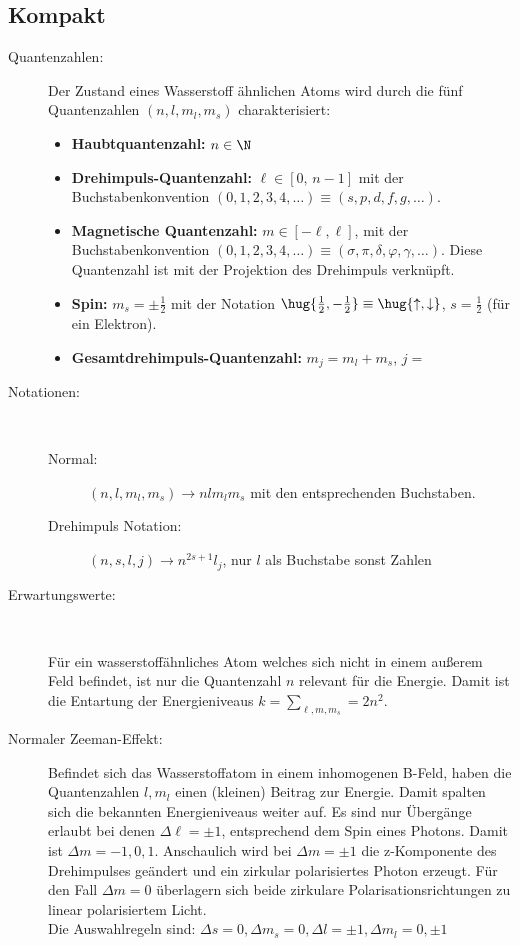 \documentclass[twocolumn]{summery_4.1}
\begin{document}
\subsection{Kompakt} 
\begin{description}
    \item[Quantenzahlen:]
    Der Zustand eines Wasserstoff ähnlichen Atoms wird durch die fünf Quantenzahlen $(n,l,m_l,m_s)$ charakterisiert:
    \begin{itemize}
        \item {\bf Haubtquantenzahl:} \(
            n\in\N\)
        \item {\bf Drehimpuls-Quantenzahl:} \(\ell\in[0,\,n-1]\)
        mit der Buchstabenkonvention \((0,1,2,3,4,\dots)\equiv (s,p,d,f,g,\dots)\). 
        \item {\bf Magnetische Quantenzahl:} \(m\in[-\ell,\ell]\), mit der Buchstabenkonvention
        \((0,1,2,3,4,\dots)\equiv (\sigma, \pi, \delta, \varphi, \gamma,\dots )\).
        Diese Quantenzahl ist mit der Projektion des Drehimpuls verknüpft.
        \item {\bf Spin:} \(m_s = \pm \frac12\) mit der Notation \(\hug{\frac12, -\frac12}\equiv \hug{\uparrow, \downarrow}\), \(s = \frac12\) (für ein Elektron). 
        \item {\bf Gesamtdrehimpuls-Quantenzahl:} \(m_j = m_l + m_s\), \(j=\)
    \end{itemize} 

    \item[Notationen:]\,
    
        \begin{description}
            \item[{\normalfont Normal:}] \((n,l,m_l,m_s) \to nlm_lm_s\) mit den entsprechenden Buchstaben.
            \item[{\normalfont  Drehimpuls Notation:}] \((n,s,l,j)\to n^{2s+1}l_j\), nur \(l\) als Buchstabe sonst Zahlen
        \end{description}

    \item[Erwartungswerte:]\,
    
    Für ein wasserstoffähnliches Atom welches sich nicht in einem außerem Feld befindet, ist nur die Quantenzahl \(n\) relevant für die Energie. Damit ist die Entartung der Energieniveaus \(k= \sum_{\ell,m,m_s} =2n^2 \).  

    \item[Normaler Zeeman-Effekt:]
    Befindet sich das Wasserstoffatom in einem inhomogenen B-Feld, haben die Quantenzahlen \(l,m_l\) einen (kleinen) Beitrag zur Energie. Damit spalten sich die bekannten Energieniveaus weiter auf.     
    Es sind nur Übergänge erlaubt bei denen \(\Delta \ell=\pm 1\), entsprechend dem Spin eines Photons. Damit ist \(\Delta m = -1,0,1\).
    Anschaulich wird bei $\Delta m = \pm1$ die z-Komponente des Drehimpulses geändert
    und ein zirkular polarisiertes Photon erzeugt. Für den Fall $\Delta m = 0$ überlagern sich beide zirkulare
    Polarisationsrichtungen zu linear polarisiertem Licht.\\
    Die Auswahlregeln sind: \(\Delta s = 0, \Delta m_s=0, \Delta l =\pm 1, \Delta m_l = 0,\pm1\)


\end{description}
\end{document}
